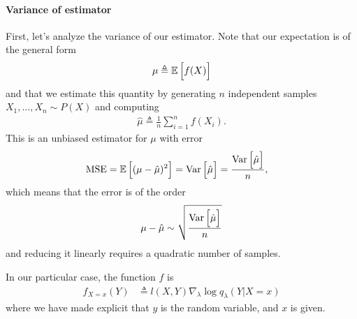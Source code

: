 \paragraph{Variance of estimator} First, let's analyze the variance of our estimator. Note that our expectation is of the general form
\begin{align*}
    \mu \triangleq \operatorname{\mathbb{E}} \Big[ f(X) \Big]
\end{align*}
and that we estimate this quantity by generating $n$ independent samples $X_1,\dots,X_n \sim P(X)$ and computing
\begin{align*}
    \hat{\mu} \triangleq \frac{1}{n} \sum_{i=1}^n f(X_i).
\end{align*}
This is an unbiased estimator for $\mu$ with error
\begin{align*}
    \text{MSE} = \operatorname{\mathbb{E}} \Big[(\mu - \hat{\mu})^2 \Big] &= \operatorname{Var} \Big[ \hat{\mu} \Big] = \frac{\operatorname{Var} \Big[ \hat{\mu} \Big]}{n},
\end{align*}
which means that the error is of the order
\begin{align*}
    \mu - \hat{\mu} \sim \sqrt{\frac{\operatorname{Var} \Big[ \hat{\mu} \Big]}{n}}
\end{align*}
and reducing it linearly requires a quadratic number of samples.

In our particular case, the function $f$ is
\begin{align*}
    f_{X=x}(Y) &\triangleq l(X,Y) \nabla_{\lambda} \log q_{\lambda}(Y|X=x)
\end{align*}
where we have made explicit that $y$ is the random variable, and $x$ is given.

